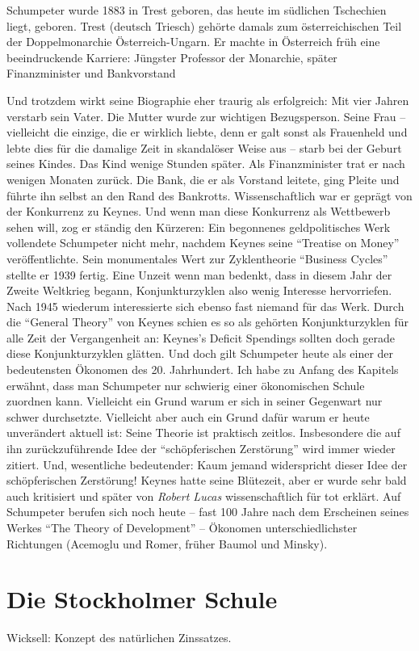 Schumpeter wurde 1883 in Trest geboren, das heute im südlichen Tschechien liegt, geboren. Trest (deutsch Triesch) gehörte damals zum österreichischen Teil der Doppelmonarchie Österreich-Ungarn. Er machte in Österreich früh eine beeindruckende Karriere: Jüngster Professor der Monarchie, später Finanzminister und Bankvorstand

Und trotzdem wirkt seine Biographie eher traurig als erfolgreich: Mit vier Jahren verstarb sein Vater. Die Mutter wurde zur wichtigen Bezugsperson. Seine Frau -- vielleicht die einzige, die er wirklich liebte, denn er galt sonst als Frauenheld und lebte dies für die damalige Zeit in skandalöser Weise aus -- starb bei der Geburt seines Kindes. Das Kind wenige Stunden später. 
Als Finanzminister trat er nach wenigen Monaten zurück. Die Bank, die er als Vorstand leitete, ging Pleite und führte ihn selbst an den Rand des Bankrotts. Wissenschaftlich war er geprägt von der Konkurrenz zu Keynes. Und wenn man diese Konkurrenz als Wettbewerb sehen will, zog er ständig den Kürzeren: Ein begonnenes geldpolitisches Werk vollendete Schumpeter nicht mehr, nachdem Keynes seine "`Treatise on Money"' veröffentlichte. Sein monumentales Wert zur Zyklentheorie "`Business Cycles"' stellte er 1939 fertig. Eine Unzeit wenn man bedenkt, dass in diesem Jahr der Zweite Weltkrieg begann, Konjunkturzyklen also wenig Interesse hervorriefen. Nach 1945 wiederum interessierte sich ebenso fast niemand für das Werk. Durch die "`General Theory"' von Keynes schien es so als gehörten Konjunkturzyklen für alle Zeit der Vergangenheit an: Keynes's Deficit Spendings sollten doch gerade diese Konjunkturzyklen glätten.
Und doch gilt Schumpeter heute als einer der bedeutensten Ökonomen des 20. Jahrhundert. Ich habe zu Anfang des Kapitels erwähnt, dass man Schumpeter nur schwierig einer ökonomischen Schule zuordnen kann. Vielleicht ein Grund warum er sich in seiner Gegenwart nur schwer durchsetzte. Vielleicht aber auch ein Grund dafür warum er heute unverändert aktuell ist: Seine Theorie ist praktisch zeitlos. Insbesondere die auf ihn zurückzuführende Idee der "`schöpferischen Zerstörung"' wird immer wieder zitiert. Und, wesentliche bedeutender: Kaum jemand widerspricht dieser Idee der schöpferischen Zerstörung! Keynes hatte seine Blütezeit, aber er wurde sehr bald auch kritisiert und später von \textit{Robert Lucas} wissenschaftlich für tot erklärt. Auf Schumpeter berufen sich noch heute -- fast 100 Jahre nach dem Erscheinen seines Werkes "`The Theory of Development"' -- Ökonomen unterschiedlichster Richtungen (Acemoglu und Romer, früher Baumol und Minsky).



\section{Die Stockholmer Schule}
Wicksell: Konzept des natürlichen Zinssatzes.